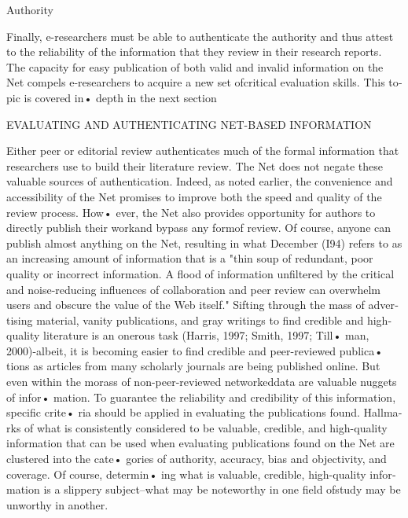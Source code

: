 \documentclass[a4 paper,12pt]{article}\usepackage{xepersian}
\begin{document}
\begin{latin}
  \vspace{0.1cm}

\vspace{0.1cm}     
Authority\\
\vspace{0.1cm}
\vspace{0.1cm}
\vspace{0.1cm}

\noindent
Finally, e-researchers must be able to authenticate the authority  and thus attest to the reliability of the information  that they review in their research reports. The capacity for  easy  publication of  both  valid  and   invalid  information  on  the Net compels e-researchers to acquire a new set ofcritical evaluation skills. This topic is covered  in• depth in the next section\\
\vspace{0.1cm}

\noindent
EVALUATING AND AUTHENTICATING NET-BASED INFORMATION\\
\vspace{0.1cm}
\vspace{0.1cm}

\noindent
Either peer or editorial review authenticates much of the formal information that researchers use to build their literature review. The Net does not negate these valuable sources of authentication. Indeed, as noted earlier, the convenience and accessibility of the Net promises to improve both the speed and quality of the review  process. How• ever, the Net also provides opportunity for authors to directly publish their workand bypass any formof review. Of course, anyone can publish almost anything on the Net, resulting in what December (I94)  refers to as an increasing amount  of information that is a "thin soup of redundant, poor quality or incorrect information. A flood of information unfiltered by  the critical and  noise-reducing influences 
\noindent
of collaboration and peer review can overwhelm  users and obscure the value of the Web itself." Sifting through the mass of advertising material, vanity publications, and gray writings to find credible and high-quality literature is an onerous task (Harris, 1997; Smith, 1997; Till• man, 2000)-albeit, it is becoming easier to find credible and peer-reviewed publica• tions as articles from  many scholarly journals are being published online. But even within the morass of non-peer-reviewed networkeddata are valuable nuggets of infor•
mation. To guarantee the reliability and credibility of this information, specific crite•
ria  should  be  applied  in  evaluating  the  publications  found. Hallmarks of what  is
consistently considered to be valuable, credible, and high-quality information that can
be  used when  evaluating  publications found  on the Net are clustered into the cate•
gories of authority, accuracy, bias and objectivity, and coverage. Of course, determin•
ing what is  valuable,  credible,  high-quality  information  is  a slippery   subject--what
may be noteworthy in one field ofstudy may be unworthy  in another.



\end{latin}
\end{document}
